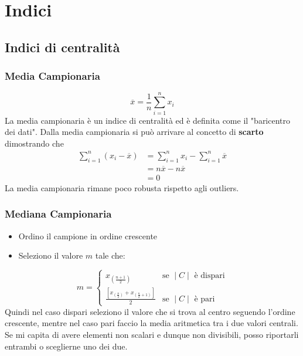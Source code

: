 \documentclass[11pt]{report}
\begin{document}
\chapter{Indici}

\section{Indici di centralità}
\subsection{Media Campionaria}
\begin{equation}
    \overline{x} = \frac{1}{n}\sum_{i=1}^n{x_i}
\end{equation}
La media campionaria è un indice di centralità ed è definita come il "baricentro dei dati". Dalla media campionaria si può arrivare al concetto di \textbf{scarto} dimostrando che
\begin{equation}
    \begin{split}
        \sum_{i=1}^n{(x_i - \overline{x})} & = \sum_{i=1}^n{x_i} - \sum_{i=1}^n{\overline{x}}\\
        & = n\overline{x} - n\overline{x}\\
        & = 0
    \end{split}
\end{equation}
La media campionaria rimane poco robusta rispetto agli outliers.
\subsection{Mediana Campionaria}
\begin{itemize}
    \item Ordino il campione in ordine crescente
    \item Seleziono il valore $m$ tale che:
\end{itemize}
\begin{equation}
	m =
	\begin{cases}
		x_{(\frac{n+1}{2})}														& \text{se }\mid C \mid \text{ è dispari} \\
		\frac{\left[x_{ \left( \frac{n}{2} \right)} + x_{ \left( \frac{n}{2} + 1 \right) }\right]}{2}		& \text{se }\mid C \mid \text{ è pari}
    \end{cases}
\end{equation}
Quindi nel caso dispari seleziono il valore che si trova al centro seguendo l'ordine crescente, mentre nel caso pari faccio la media aritmetica tra i due valori centrali. Se mi capita di avere elementi non scalari e dunque non divisibili, posso riportarli entrambi o sceglierne uno dei due.
\end{document}
